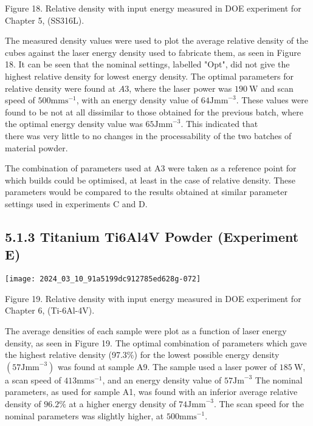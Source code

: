 \documentclass[10pt]{article}
\begin{document}
Figure 18. Relative density with input energy measured in DOE experiment for Chapter 5, (SS316L).

The measured density values were used to plot the average relative density of the cubes against the laser energy density used to fabricate them, as seen in Figure 18. It can be seen that the nominal settings, labelled "Opt", did not give the highest relative density for lowest energy density. The optimal parameters for relative density were found at $A 3$, where the laser power was $190 \mathrm{~W}$ and scan speed of $500 \mathrm{mms}^{-1}$, with an energy density value of $64 \mathrm{Jmm}^{-3}$. These values were found to be not at all dissimilar to those obtained for the previous batch, where the optimal energy density value was $65 \mathrm{Jmm}^{-3}$. This indicated that\\
there was very little to no changes in the processability of the two batches of material powder.

The combination of parameters used at A3 were taken as a reference point for which builds could be optimised, at least in the case of relative density. These parameters would be compared to the results obtained at similar parameter settings used in experiments C and D.

\subsection*{5.1.3 Titanium Ti6Al4V Powder (Experiment E)}
\begin{center}
\texttt{[image: 2024\_03\_10\_91a5199dc912785ed628g-072]}
\end{center}

Figure 19. Relative density with input energy measured in DOE experiment for Chapter 6, (Ti-6Al-4V).

The average densities of each sample were plot as a function of laser energy density, as seen in Figure 19. The optimal combination of parameters which gave the highest relative density (97.3\%) for the lowest possible energy density $\left(57 \mathrm{Jmm}^{-3}\right)$ was found at sample A9. The sample used a laser power of $185 \mathrm{~W}$, a scan speed of $413 \mathrm{mms}^{-1}$, and an energy density value of $57 \mathrm{Jm}^{-3}$ The nominal parameters, as used for sample A1, was found with an inferior average relative density of $96.2 \%$ at a higher energy density of $74 \mathrm{Jmm}^{-3}$. The scan speed for the nominal parameters was slightly higher, at $500 \mathrm{mms}^{-1}$.
\end{document}
